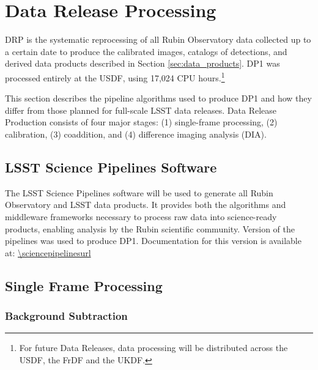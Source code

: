 \section{Data Release Processing}
\label{sec:drp}

\gls{DRP} is the systematic reprocessing of all Rubin Observatory data collected up to a certain date to produce the calibrated images, catalogs of detections, and derived data products described in Section \ref{sec:data_products}.
DP1 was processed entirely at the \gls{USDF}, using 17,024 CPU hours.\footnote{For future Data Releases, data processing will be distributed across the \gls{USDF}, the \gls{FrDF} and the \gls{UKDF}.}

This section describes the pipeline algorithms used to produce \gls{DP1} and how they differ from those planned for full-scale LSST data releases.
Data Release Production consists of four major stages: (1) single-frame processing, (2) calibration, (3) coaddition, and (4) difference imaging analysis (\gls{DIA}).

\subsection{LSST Science Pipelines Software}
\label{ssec:pipelines}
The \gls{LSST Science Pipelines} software \citep{PSTN-019, LDM-151} will be used to generate all Rubin Observatory and LSST data products.
It provides both the \glspl{algorithm} and \gls{middleware} frameworks necessary to process raw data into science-ready products, enabling analysis by the Rubin scientific community.
Version \sciencepipelinesversion of the pipelines was used to produce \gls{DP1}.
Documentation for this version is available at: \url{\sciencepipelinesurl}

\subsection{Single Frame Processing
\label{ssec:single_frame_processing}}



\subsubsection{Background Subtraction}
\label{ssec:background_subtraction}

